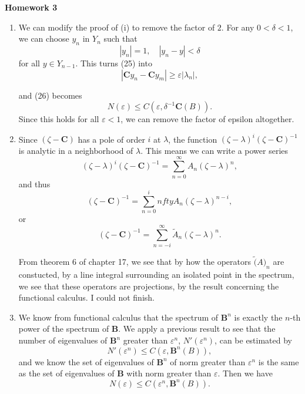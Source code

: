 \documentclass[11pt, reqno]{article}
\theoremstyle{plain}
\theoremstyle{definition}
\theoremstyle{remark}
\renewcommand{\epsilon}{\varepsilon}
\begin{document}
\topmargin=-40pt
\renewcommand{\headrulewidth}{1pt}
\renewcommand{\headsep}{20pt}
\thispagestyle{fancy}

{\Huge \bfseries \noindent Homework 3}

\begin{enumerate}
    \item[3.] We can modify the proof of (i) to remove the factor of $2$. For any $0 < \delta < 1$,
    we can choose $y_n$ in $Y_n$ such that 
    \[  
        |y_n| = 1, \quad |y_n - y| < \delta
    \]
    for all $y \in Y_{n-1}$. This turns (25) into 
    \[
        |\textbf{C} y_n - \textbf{C} y_m| \geq \epsilon |\lambda_n|,
    \]

    and (26) becomes 
    \[
        N(\epsilon) \leq C(\epsilon, \delta^{-1}\textbf{C}(B)).
    \]
    Since this holds for all $\epsilon < 1$, we can remove the factor of epsilon altogether.

    \item[4.] Since $(\zeta - \textbf{C})$ has a pole of order $i$ at $\lambda$, the function 
    $(\zeta - \lambda)^i (\zeta - \textbf{C})^{-1}$ is analytic in a neighborhood of $\lambda$. This means 
    we can write a power series 
    \[
        (\zeta - \lambda)^i (\zeta - \textbf{C})^{-1} = \sum_{n = 0}^\infty A_n (\zeta - \lambda)^n,
    \]
    and thus 
    \[
        (\zeta - \textbf{C})^{-1} = \sum_{n = 0}^infty A_n(\zeta - \lambda)^{n-i},
    \]
    or 
    \[
        (\zeta - \textbf{C})^{-1} = \sum_{n = -i}^\infty \tilde{A}_n (\zeta - \lambda)^n.
    \]

    From theorem 6 of chapter 17, we see that by how the operators $\tilde(A)_n$ are constucted, by a line
    integral surrounding an isolated point in the spectrum, we see that these operators are projections, by the result
    concerning the functional calculus. I could not finish.

    \item[6.] We know from functional calculus that the spectrum of $\textbf{B}^n$ is exactly the $n$-th power 
    of the spectrum of $\textbf{B}$. We apply a previous result to see that the number of eigenvalues of $\textbf{B}^n$
    greater than $\epsilon^n$, $N'(\epsilon^n)$, can be estimated by
    \[
        N'(\epsilon^n) \leq C(\epsilon, \textbf{B}^n(B)),
    \]
    and we know the set of eigenvalues of $\textbf{B}^n$ of norm greater than $\epsilon^n$ is the same 
    as the set of eigenvalues of $\textbf{B}$ with norm greater than $\epsilon$. Then we have
    \[
        N(\epsilon) \leq C(\epsilon^n, \textbf{B}^n(B)).
    \]


\end{enumerate}
\end{document}
